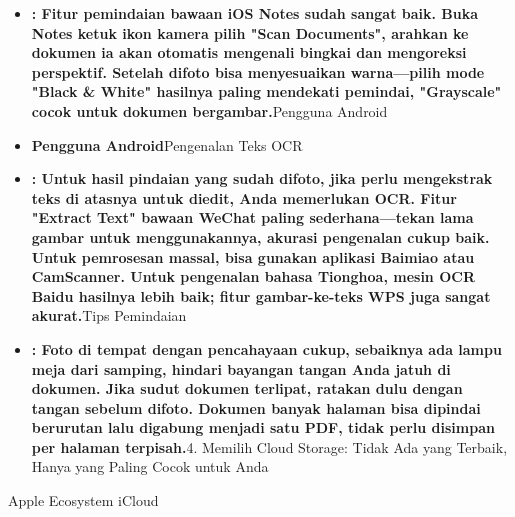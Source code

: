 \begin{itemize}
  \item \textbf{: Fitur pemindaian bawaan iOS Notes sudah sangat baik. Buka Notes ketuk ikon kamera pilih "Scan Documents", arahkan ke dokumen ia akan otomatis mengenali bingkai dan mengoreksi perspektif. Setelah difoto bisa menyesuaikan warna—pilih mode "Black \& White" hasilnya paling mendekati pemindai, "Grayscale" cocok untuk dokumen bergambar.}Pengguna Android
  \item \textbf{Pengguna Android}Pengenalan Teks OCR
  \item \textbf{: Untuk hasil pindaian yang sudah difoto, jika perlu mengekstrak teks di atasnya untuk diedit, Anda memerlukan OCR. Fitur "Extract Text" bawaan WeChat paling sederhana—tekan lama gambar untuk menggunakannya, akurasi pengenalan cukup baik. Untuk pemrosesan massal, bisa gunakan aplikasi Baimiao atau CamScanner. Untuk pengenalan bahasa Tionghoa, mesin OCR Baidu hasilnya lebih baik; fitur gambar-ke-teks WPS juga sangat akurat.}Tips Pemindaian
  \item \textbf{: Foto di tempat dengan pencahayaan cukup, sebaiknya ada lampu meja dari samping, hindari bayangan tangan Anda jatuh di dokumen. Jika sudut dokumen terlipat, ratakan dulu dengan tangan sebelum difoto. Dokumen banyak halaman bisa dipindai berurutan lalu digabung menjadi satu PDF, tidak perlu disimpan per halaman terpisah.}4. Memilih Cloud Storage: Tidak Ada yang Terbaik, Hanya yang Paling Cocok untuk Anda
\end{itemize}


Apple Ecosystem iCloud

